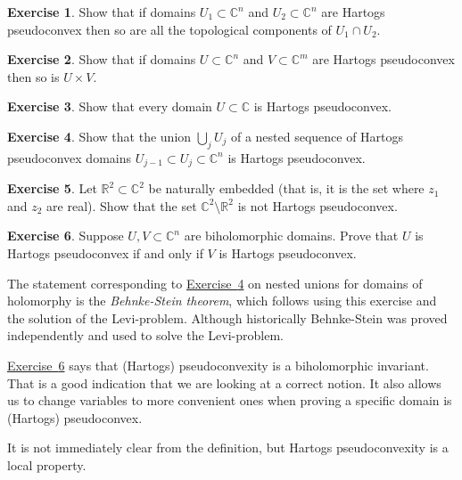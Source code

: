 \documentclass[12pt,openany]{book}
\newcommand{\C}{{\mathbb{C}}}
\newcommand{\R}{{\mathbb{R}}}
\newcommand{\myindex}[1]{#1\index{#1}}
\theoremstyle{plain}
\theoremstyle{remark}
\theoremstyle{definition}
\newenvironment{exbox}{%
    \def\FrameCommand{\vrule width 1pt \relax\hspace {10pt}}%
    \MakeFramed {\advance \hsize -\width \FrameRestore }%
}{%
    \endMakeFramed
}
\theoremstyle{exercise}
\newtheorem{exercise}{Exercise}[section]
\theoremstyle{example}
\newcommand{\exerciseref}[1]{\hyperref[#1]{Exercise~\ref*{#1}}}
\begin{document}
\begin{exbox}
\begin{exercise}
Show that if domains $U_1 \subset \C^n$ and $U_2 \subset \C^n$ are Hartogs
pseudoconvex then so are all the topological components of $U_1 \cap U_2$.
\end{exercise}

\begin{exercise}
Show that if domains $U \subset \C^n$ and $V \subset \C^m$ are Hartogs
pseudoconvex then so is $U \times V$.
\end{exercise}

\begin{exercise}
Show that every domain $U \subset \C$ is Hartogs pseudoconvex.
\end{exercise}

\begin{exercise} \label{exercise:nestedunions}
Show that the union $\bigcup_j U_j$ of a nested sequence of Hartogs pseudoconvex
domains $U_{j-1} \subset U_j \subset \C^n$ is Hartogs pseudoconvex.
\end{exercise}

\begin{exercise}
Let $\R^2 \subset \C^2$ be naturally embedded (that is, it is the
set where $z_1$ and $z_2$ are real).  Show that the set $\C^2 \setminus
\R^2$ is not Hartogs pseudoconvex.
\end{exercise}

\begin{exercise} \label{exercise:biholHartogs}
Suppose $U,V \subset \C^n$ are biholomorphic domains.
Prove that $U$ is Hartogs pseudoconvex if and only if $V$ is
Hartogs pseudoconvex.
\end{exercise}
\end{exbox}

The statement corresponding to \exerciseref{exercise:nestedunions} on nested unions
for domains of holomorphy is
the \emph{\myindex{Behnke-Stein theorem}}, which follows using this exercise and the solution
of the Levi-problem.  Although historically Behnke-Stein was proved
independently and used to solve the Levi-problem.

\exerciseref{exercise:biholHartogs} says that (Hartogs) pseudoconvexity is a
biholomorphic invariant.  That is a good indication that we are looking at a
correct notion.  It also allows us to change variables to more convenient
ones when proving a specific domain is (Hartogs) pseudoconvex.

It is not immediately clear from the definition, but Hartogs pseudoconvexity
is a local property.
\end{document}
